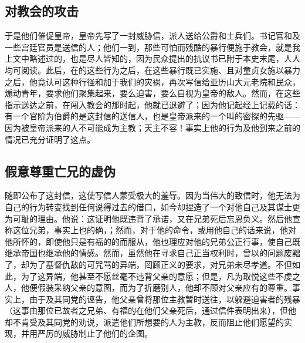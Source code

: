 
\subsection{对教会的攻击}

于是他们催促皇帝，皇帝先写了一封威胁信，派人送给公爵和士兵们。书记官和及一些宫廷官员是送信的人；他们一到，那些可怕而残酷的暴行便施于教会，就是我上文中略述过的，也是尽人皆知的，因为民众提出的抗议书已附于本史末尾，人人均可阅读。此后，在的这些行为之后，在这些暴行既已实施、且对童贞女施以暴力之后，他竟认可这种行径和加于我们的灾祸，再次写信给亚历山大元老院和民众，煽动青年，要求他们聚集起来，要么迫害，要么自视为皇帝的敌人。然而，在这些指示送达之前，在闯入教会的那时起，他就已退避了；因为他记起经上记载的话：有一个官阶为伯爵的是这封信的送信人，也是皇帝派来的一个叫的密探的先驱——因为被皇帝派来的人不可能成为主教；天主不容！事实上他的行为及他到来之前的情况已充分证明了这点。\par


\subsection{假意尊重亡兄的虚伪}

随即公布了这封信，这使写信人蒙受极大的羞辱。因为当伟大的致信时，他无法为自己的行为转变找到任何说得过去的借口，如今却捏造了一个对他自己及其谋士更为可耻的理由。他说：这证明他既违背了承诺，又在兄弟死后忘恩负义。然后他宣称这位兄弟，事实上也的确，；然而，对于他的命令，或用他自己的话来说，他对他所怀的，即使他只是有福的的而服从，他也理应对他的兄弟公正行事，使自己既继承帝国也继承他的情感。然而，虽然他在寻求自己正当权利时，曾以的问题废黜了，却为了基督仇敌的可咒骂的异端，罔顾正义的要求，对兄弟未尽孝道。不但如此，为了这异端，他甚至不愿丝毫不违背父亲的意愿；但是，凡为取悦这些不虔之人，他便假装采纳父亲的意图，而为了折磨别人，他却不顾对父亲应有的尊重。事实上，由于及其同党的诬告，他父亲曾将那位主教暂时送往，以躲避迫害者的残暴（这事由那位已故者之兄弟、有福的在他们父亲死后，通过信件表明出来），但他却不肯受及其同党的劝说，派遣他们所想要的人为主教，反而阻止他们愿望的实现，并用严厉的威胁制止了他们的企图。\par

